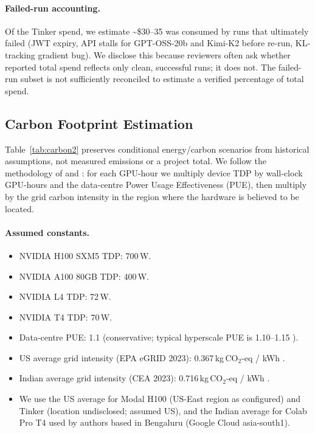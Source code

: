 \paragraph{Failed-run accounting.} Of the Tinker spend, we estimate
\textasciitilde\$30--35 was consumed by runs that ultimately failed
(JWT expiry, API stalls for GPT-OSS-20b and Kimi-K2 before re-run,
KL-tracking gradient bug). We disclose this because reviewers often ask
whether reported total spend reflects only clean, successful runs; it does
not. The failed-run subset is not sufficiently reconciled to estimate a verified
percentage of total spend.

\subsection{Carbon Footprint Estimation}
\label{sec:carbon}

Table~\ref{tab:carbon2} preserves conditional energy/carbon scenarios
from historical assumptions, not measured emissions or a project total. We follow the methodology of
\citet{patterson2024empirical} and \citet{strubell2019energy}: for each
GPU-hour we multiply device TDP by wall-clock GPU-hours and the data-centre
Power Usage Effectiveness (PUE), then multiply by the grid carbon intensity
in the region where the hardware is believed to be located.

\paragraph{Assumed constants.}
\begin{itemize}
  \item NVIDIA H100 SXM5 TDP: 700\,W.
  \item NVIDIA A100 80GB TDP: 400\,W.
  \item NVIDIA L4 TDP: 72\,W.
  \item NVIDIA T4 TDP: 70\,W.
  \item Data-centre PUE: 1.1 (conservative; typical hyperscale PUE is
        1.10--1.15 \cite{google2023pue, aws2023pue}).
  \item US average grid intensity (EPA eGRID 2023): 0.367\,kg\,CO$_2$-eq / kWh
        \cite{epa2023egrid}.
  \item Indian average grid intensity (CEA 2023): 0.716\,kg\,CO$_2$-eq / kWh
        \cite{cea2023co2}.
  \item We use the US average for Modal H100 (US-East region as configured)
        and Tinker (location undisclosed; assumed US), and the Indian
        average for Colab Pro T4 used by authors based in Bengaluru
        (Google Cloud asia-south1).
\end{itemize}

